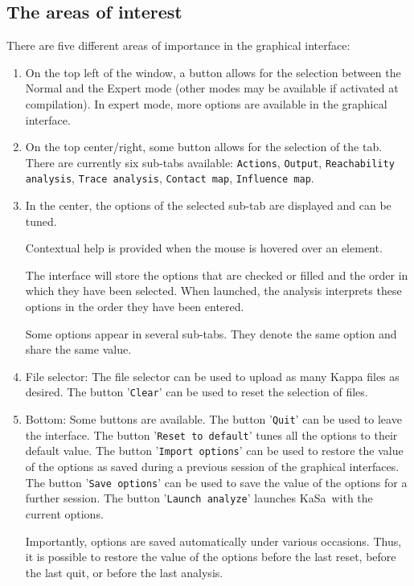 \documentclass[11pt]{book}
\def\KaSa{\textsf{KaSa}}
\begin{document}
\subsection{The areas of interest}

There are five different areas of importance in the graphical interface:
\begin{enumerate}
\item On the top left of the window, a button allows for the selection between the Normal and the Expert mode (other modes may be available if activated at compilation).
In expert mode, more options are available in the graphical interface.
\item On the top center/right, some button allows for the selection of the tab. There are currently six sub-tabs available: \texttt{Actions}, \texttt{Output}, \texttt{Reachability analysis}, \texttt{Trace analysis}, \texttt{Contact map}, \texttt{Influence map}.

\item In the center, the options of the selected sub-tab are displayed and can be tuned.

Contextual help is provided when the mouse is hovered over an element.

The interface will store the options that are checked or filled and the order in which they have been selected.
When launched, the analysis interprets these options in the order they have been entered.

Some options appear in several sub-tabs. They denote the same option and share the same value.

\item File selector: The file selector can be used to upload as many Kappa files as desired. The button '\texttt{Clear}' can be used to reset the selection of files.
\item Bottom: Some buttons are available. The button '\texttt{Quit}' can be used to leave the interface. The button '\texttt{Reset to default}' tunes all the options to their default value. The button '\texttt{Import options}' can be used to restore the value of the options as saved during a previous session of the graphical interfaces. The button '\texttt{Save options}' can be used to save the value of the options for a further session. The button '\texttt{Launch analyze}' launches \KaSa\ with the current options.

Importantly, options are saved automatically under various occasions. Thus, it is possible to restore the value of the options
before the last reset, before the last quit, or before the last analysis.
\end{enumerate}
\end{document}
